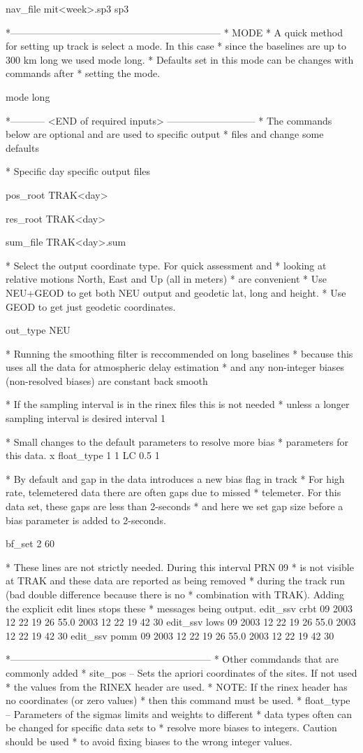 \documentclass[11pt]{article} %
\begin{document}
 nav_file mit<week>.sp3 sp3


*-----------------------------------------------------------------
* MODE
* A quick method for setting up track is select a mode.  In this case
* since the baselines are up to 300 km long we used mode long.
* Defaults set in this mode can be changes with commands after 
* setting the mode.
 
 mode long

*----------- <END of required inputs> ---------------------------
* The commands below are optional and are used to specific output
* files and change some defaults

* Specific day specific output files

 pos_root TRAK<day>

 res_root TRAK<day>

 sum_file TRAK<day>.sum

* Select the output coordinate type.  For quick assessment and
* looking at relative motions North, East and Up (all in meters)
* are convenient
* Use NEU+GEOD to get both NEU output and geodetic lat, long and height.
* Use GEOD to get just geodetic coordinates.

 out_type NEU

* Running the smoothing filter is reccommended on long baselines
* because this uses all the data for atmospheric delay estimation
* and any non-integer biases (non-resolved biases) are constant
 back smooth

* If the sampling interval is in the rinex files this is not needed
* unless a longer sampling interval is desired
 interval 1

* Small changes to the default parameters to resolve more bias
* parameters for this data.
x float_type 1 1 LC  0.5 1 

* By default and gap in the data introduces a new bias flag in track
* For high rate, telemetered data there are often gaps due to missed
* telemeter.  For this data set, these gaps are less than 2-seconds 
* and here we set gap size before a bias parameter is added to 2-seconds.

 bf_set  2  60

* These lines are not strictly needed.  During this interval PRN 09
* is not visible at TRAK and these data are reported as being removed
* during the track run (bad double difference because there is no 
* combination with TRAK). Adding the explicit edit lines stops these
* messages being output.
 edit_ssv crbt 09 2003 12 22 19 26 55.0 2003 12 22 19 42 30
 edit_ssv lows 09 2003 12 22 19 26 55.0 2003 12 22 19 42 30
 edit_ssv pomm 09 2003 12 22 19 26 55.0 2003 12 22 19 42 30

*--------------------------------------------------------------
* Other commdands that are commonly added
* site_pos -- Sets the apriori coordinates of the sites.  If not used
*             the values from the RINEX header are used.  
*             NOTE: If the rinex header has no coordinates (or zero values)
*             then this command must be used.
* float_type -- Parameters of the sigmas limits and weights to different
*             data types often can be changed for specific data sets to
*             resolve more biases to integers.  Caution should be used 
*             to avoid fixing biases to the wrong integer values.
\end{document}
